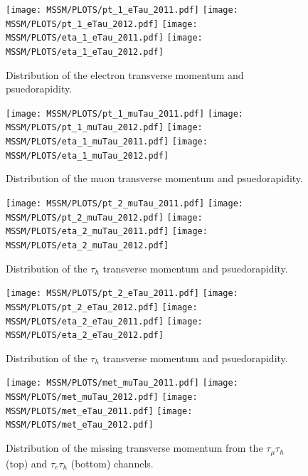\begin{figure}[htbp]
  \begin{center}
    \texttt{[image: MSSM/PLOTS/pt\_1\_eTau\_2011.pdf]}
    \texttt{[image: MSSM/PLOTS/pt\_1\_eTau\_2012.pdf]}
    \texttt{[image: MSSM/PLOTS/eta\_1\_eTau\_2011.pdf]}
    \texttt{[image: MSSM/PLOTS/eta\_1\_eTau\_2012.pdf]}
    \caption{
      Distribution of the electron transverse momentum and psuedorapidity.    }
    \label{figure:eKinematics}
  \end{center}
\end{figure}


\begin{figure}[htbp]
  \begin{center}
    \texttt{[image: MSSM/PLOTS/pt\_1\_muTau\_2011.pdf]}
    \texttt{[image: MSSM/PLOTS/pt\_1\_muTau\_2012.pdf]}
    \texttt{[image: MSSM/PLOTS/eta\_1\_muTau\_2011.pdf]}
    \texttt{[image: MSSM/PLOTS/eta\_1\_muTau\_2012.pdf]}
    \caption{
      Distribution of the muon transverse momentum and psuedorapidity.    }
    \label{figure:muKinematics}
  \end{center}
\end{figure}


\begin{figure}[htbp]
  \begin{center}
    \texttt{[image: MSSM/PLOTS/pt\_2\_muTau\_2011.pdf]}
    \texttt{[image: MSSM/PLOTS/pt\_2\_muTau\_2012.pdf]}
    \texttt{[image: MSSM/PLOTS/eta\_2\_muTau\_2011.pdf]}
    \texttt{[image: MSSM/PLOTS/eta\_2\_muTau\_2012.pdf]}
    \caption{
      Distribution of the $\tau_{h}$ transverse momentum and psuedorapidity.
    }
    \label{figure:MTauKinematics}
  \end{center}
\end{figure}

\begin{figure}[htbp]
  \begin{center}
    \texttt{[image: MSSM/PLOTS/pt\_2\_eTau\_2011.pdf]}
    \texttt{[image: MSSM/PLOTS/pt\_2\_eTau\_2012.pdf]}
    \texttt{[image: MSSM/PLOTS/eta\_2\_eTau\_2011.pdf]}
    \texttt{[image: MSSM/PLOTS/eta\_2\_eTau\_2012.pdf]}
    \caption{
      Distribution of the $\tau_{h}$ transverse momentum and psuedorapidity.}
    \label{figure:ETauKinematics}
  \end{center}
\end{figure}

\begin{figure}[htbp]
  \begin{center}
    \texttt{[image: MSSM/PLOTS/met\_muTau\_2011.pdf]}
    \texttt{[image: MSSM/PLOTS/met\_muTau\_2012.pdf]}
    \texttt{[image: MSSM/PLOTS/met\_eTau\_2011.pdf]}
    \texttt{[image: MSSM/PLOTS/met\_eTau\_2012.pdf]}
    \caption{
      Distribution of the missing transverse momentum from the $\tau_{\mu}\tau_{h}$ (top) and  $\tau_{e}\tau_{h}$ (bottom) channels.}
    \label{figure:MET}
  \end{center}
\end{figure}



